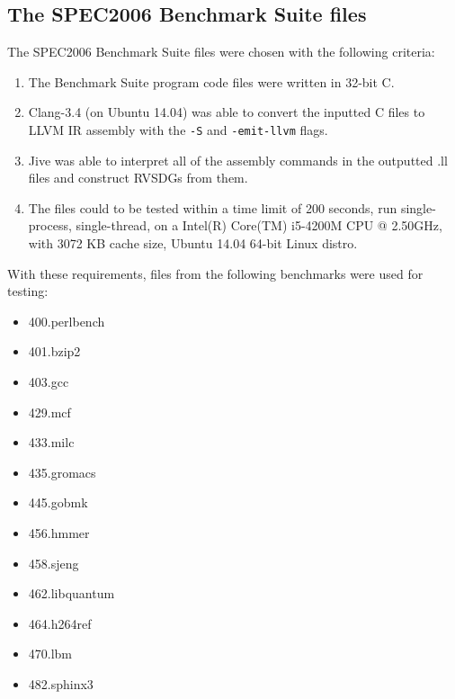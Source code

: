 \subsection{The SPEC2006 Benchmark Suite files}
\label{sub:scheme:SPEC2006_files}

The SPEC2006 Benchmark Suite files were chosen with the following criteria:

\begin{enumerate}
	\item The Benchmark Suite program code files were written in 32-bit C.

	\item Clang-3.4 (on Ubuntu 14.04) was able to convert the inputted C files
to LLVM IR assembly with the \lstinline!-S! and \lstinline!-emit-llvm! flags.

	\item Jive was able to interpret all of the assembly commands in the
outputted .ll files and construct RVSDGs from them.

	\item The files could to be tested within a time limit of 200 seconds, run
single-process, single-thread, on a Intel(R) Core(TM) i5-4200M CPU @ 2.50GHz,
with 3072 KB cache size, Ubuntu 14.04 64-bit Linux distro.
\end{enumerate}


With these requirements, files from the following benchmarks were used for
testing:

\begin{multicols}{4}
	\begin{itemize}
		\item 400.perlbench
		\item 401.bzip2
		\item 403.gcc
		\item 429.mcf
		\item 433.milc
		\item 435.gromacs
		\item 445.gobmk
		\item 456.hmmer
		\item 458.sjeng
		\item 462.libquantum
		\item 464.h264ref
		\item 470.lbm
		\item 482.sphinx3
	\end{itemize}
\end{multicols}

